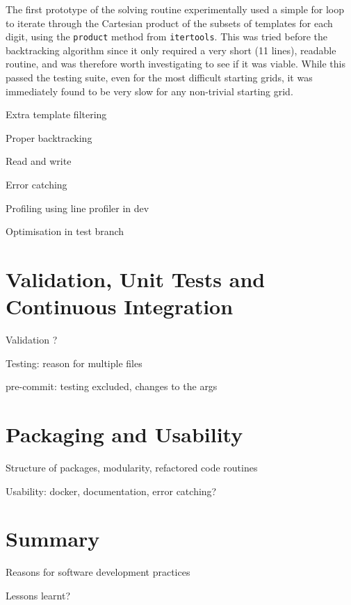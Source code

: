 \documentclass[12pt]{article}
\begin{document}
The first prototype of the solving routine experimentally used a simple for loop to iterate through the Cartesian product of the subsets of templates for each digit, using the \texttt{product} method from \texttt{itertools}.
This was tried before the backtracking algorithm since it only required a very short (11 lines), readable routine, and was therefore worth investigating to see if it was viable.
While this passed the testing suite, even for the most difficult starting grids, it was immediately found to be very slow for any non-trivial starting grid.


Extra template filtering

Proper backtracking

Read and write

Error catching

Profiling using line profiler in dev

Optimisation in test branch

\section*{Validation, Unit Tests and Continuous Integration}

Validation ?

Testing: reason for multiple files

pre-commit: testing excluded, changes to the args

\section*{Packaging and Usability}

Structure of packages, modularity, refactored code routines

Usability: docker, documentation, error catching?

\section*{Summary}

Reasons for software development practices

Lessons learnt?


\end{document}
